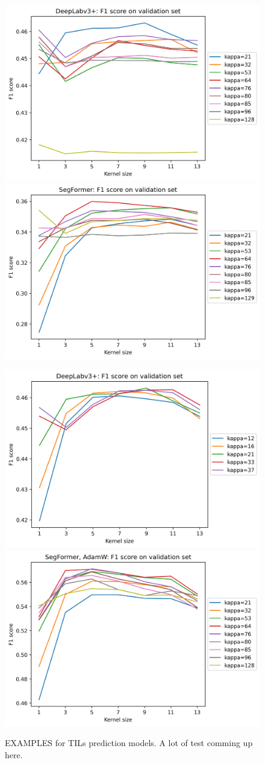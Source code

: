 \begin{figure}[h!]
\includegraphics[width=.5\linewidth]{figures/tils/deeplabv3+_f1_kappas_kernels_plot.png}
\includegraphics[width=.5\linewidth]{figures/tils/segformer_f1_kappas_kernels_plot.png}

\includegraphics[width=.5\linewidth]{figures/tils/deeplabv3+_f1_kappas_kernels_plot_zooomed.png}
\includegraphics[width=.5\linewidth]{figures/tils/segformer,_adamw_f1_kappas_kernels_plot.png}

\caption{EXAMPLES for TILs prediction models. A lot of test comming up here.}
\label{fig:figure3}

\end{figure}

